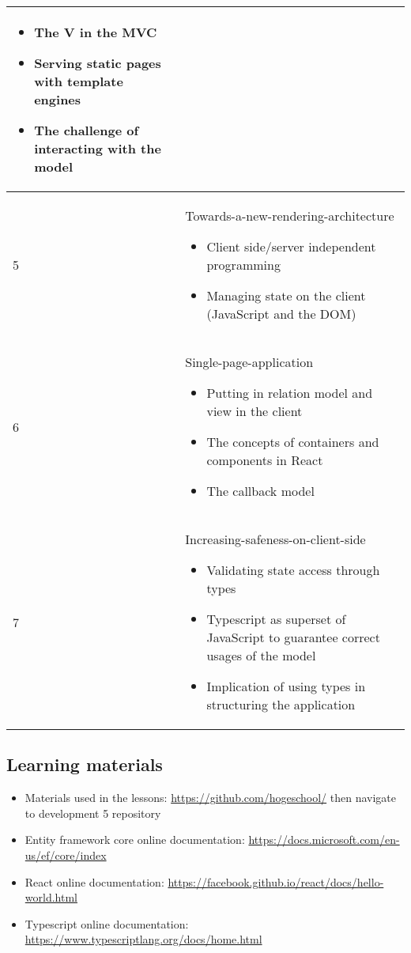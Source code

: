 \begin{tabular}{ | p{1.2cm} | p{10cm} | }
  		\begin{itemize}[nolistsep]
					\item The V in the MVC
					\item Serving static pages with template engines
					\item The challenge of interacting with the model
				\end{itemize}
  		 \\
  		\hline
  		5 & Towards-a-new-rendering-architecture
  		\begin{itemize}[nolistsep]
					\item Client side/server independent programming
					\item Managing state on the client (JavaScript and the DOM)
				\end{itemize}
  		 \\
  		\hline
  		6 & Single-page-application
  		\begin{itemize}[nolistsep]
				\item Putting in relation model and view in the client
				\item The concepts of containers and components in React
				\item The callback model
			\end{itemize}
			\\
  		\hline
  		7 & Increasing-safeness-on-client-side
  		\begin{itemize}[nolistsep]
				\item Validating state access through types
				\item Typescript as superset of JavaScript to guarantee correct usages of the model
				\item Implication of using types in structuring the application
				\end{itemize} 
				\\
			\hline
	\end{tabular}
		
\begin{comment}
    A unit does not necessarily match with a lesson. Some subjects of a unit could be discussed in tow different lessons.
\end{comment}
\newpage
\subsection{Learning materials}\label{learning-materials}
\begin{itemize}[nolistsep]
\item
  Materials used in the lessons:
  \url{https://github.com/hogeschool/} then navigate to development 5 repository
\item
  Entity framework core online documentation:
  \url{https://docs.microsoft.com/en-us/ef/core/index}
\item
  React online documentation:
  \url{https://facebook.github.io/react/docs/hello-world.html}
\item
  Typescript online documentation:
 \url{https://www.typescriptlang.org/docs/home.html}
\end{itemize}

